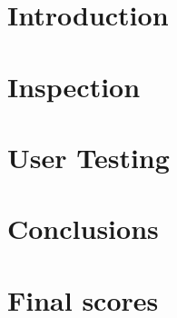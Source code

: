 \documentclass[10pt]{report}
\begin{document}

\restoregeometry

\setcounter{tocdepth}{5}

\let\LaTeXStandardClearpage\clearpage
\let\clearpage\relax %

\tableofcontents
\listoffigures
\listoftables

\let\clearpage\LaTeXStandardClearpage %

\justify

\chapter{Introduction}

\pagebreak

\chapter{Inspection}

\pagebreak

\chapter{User Testing}

\pagebreak

\chapter{Conclusions}

\pagebreak

\appendix
\chapter{Final scores}

\pagebreak

\printbibliography
\end{document}
